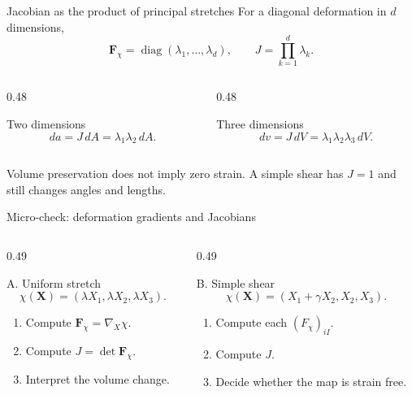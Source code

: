 \documentclass[aspectratio=169,11pt]{beamer}
\newcommand{\X}{\bm{X}}
\newcommand{\Fdef}{\bm{F}_{\chi}}
\newcommand{\gradX}{\nabla_{\!X}}
\begin{document}
\begin{frame}{Jacobian as the product of principal stretches}
For a diagonal deformation in \(d\) dimensions,
\[
  \Fdef=\operatorname{diag}(\lambda_1,\ldots,\lambda_d),
  \qquad
  J=\prod_{k=1}^{d}\lambda_k .
\]
\begin{columns}[T,onlytextwidth]
\begin{column}{0.48\textwidth}
\begin{block}{Two dimensions}
\[
  da=J\,dA
  =\lambda_1\lambda_2\,dA .
\]
\end{block}
\end{column}
\begin{column}{0.48\textwidth}
\begin{block}{Three dimensions}
\[
  dv=J\,dV
  =\lambda_1\lambda_2\lambda_3\,dV .
\]
\end{block}
\end{column}
\end{columns}
\medskip
\begin{punchbox}
\small
Volume preservation does not imply zero strain. A simple shear has \(J=1\) and still changes angles and lengths.
\end{punchbox}
\end{frame}

\begin{frame}{Micro-check: deformation gradients and Jacobians}
\begin{columns}[T,onlytextwidth]
\begin{column}{0.49\textwidth}
\begin{block}{A. Uniform stretch}
\[
  \chi(\X)
  =
  (\lambda X_1,\lambda X_2,\lambda X_3).
\]
\begin{enumerate}\itemsep5pt
  \item Compute \(\Fdef=\gradX\chi\).
  \item Compute \(J=\det\Fdef\).
  \item Interpret the volume change.
\end{enumerate}
\end{block}
\end{column}
\begin{column}{0.49\textwidth}
\begin{block}{B. Simple shear}
\[
  \chi(\X)
  =
  (X_1+\gamma X_2,X_2,X_3).
\]
\begin{enumerate}\itemsep5pt
  \item Compute each \((F_\chi)_{iI}\).
  \item Compute \(J\).
  \item Decide whether the map is strain free.
\end{enumerate}
\end{block}
\end{column}
\end{columns}
\end{frame}
\end{document}
